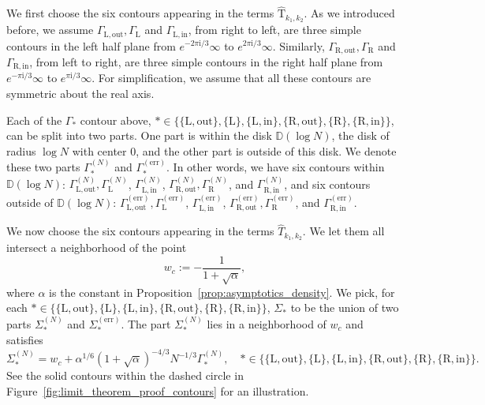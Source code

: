 \documentclass{article}
\numberwithin{equation}{section}
\newcommand{\exe}{\mathrm{err}}
\newcommand{\ii}{\mathrm{i}}
\newcommand{\inn}{\mathrm{in}}
\newcommand{\LL}{\mathrm{L}}
\newcommand{\out}{\mathrm{out}}
\newcommand{\RR}{\mathrm{R}}
\begin{document}
We first choose the six contours appearing in the terms $\mathrm{\hat T}_{k_1,k_2}$. As we introduced before, we assume $\Gamma_{\LL,\out},\Gamma_\LL$ and $\Gamma_{\LL,\inn}$, from right to left, are three  simple contours in the left half plane from $e^{-2\pi\ii/3}\infty$ to $e^{2\pi\ii/3}\infty$. Similarly, $\Gamma_{\RR,\out},\Gamma_\RR$ and $\Gamma_{\RR,\inn}$, from left to right, are three  simple contours in the right half plane from $e^{-\pi\ii/3}\infty$ to $e^{\pi\ii/3}\infty$. For simplification, we assume that all these contours are symmetric about the real axis.

Each of the $\Gamma_*$ contour above, $*\in\{\{\LL,\out\},\{\LL\},\{\LL,\inn\},\{\RR,\out\},\{\RR\},\{\RR,\inn\}\}$, can be split into two parts. One part is within the disk $\mathbb{D}(\log N)$, the disk of radius $\log N$ with center $0$, and the other part is outside of this disk. We denote these two parts $\Gamma^{(N)}_*$ and $\Gamma^{(\exe)}_*$. In other words, we have six contours within $\mathbb{D}(\log N)$:  $\Gamma_{\LL,\out}^{(N)},\Gamma_\LL^{(N)}$, $\Gamma_{\LL,\inn}^{(N)}$,  $\Gamma_{\RR,\out}^{(N)},\Gamma_\RR^{(N)}$, and $\Gamma_{\RR,\inn}^{(N)}$, and six contours outside of $\mathbb{D}(\log N)$:  $\Gamma_{\LL,\out}^{(\exe)},\Gamma_\LL^{(\exe)}$, $\Gamma_{\LL,\inn}^{(\exe)}$,  $\Gamma_{\RR,\out}^{(\exe)},\Gamma_\RR^{(\exe)}$, and $\Gamma_{\RR,\inn}^{(\exe)}$.

We now choose the six contours appearing in the terms $\hat T_{k_1,k_2}$. We let them all intersect a neighborhood  of the point
\begin{equation}
	\label{eq:def_w_c}
	w_c:=-\frac{1}{1+\sqrt{\alpha}},
	\end{equation}
where $\alpha$ is the constant in Proposition~\ref{prop:asymptotics_density}.
We pick, for each $*\in\{\{\LL,\out\},\{\LL\},\{\LL,\inn\},\{\RR,\out\},\{\RR\},\{\RR,\inn\}\}$, $\Sigma_*$ to be the union of two parts $\Sigma_*^{(N)}$ and $\Sigma_*^{(\exe)}$. The part $\Sigma_*^{(N)}$ lies in a neighborhood of $w_c$ and satisfies
\begin{equation}
	\label{eq:relation_contours}
	\Sigma_{*}^{(N)}= w_c + \alpha^{1/6}(1+\sqrt{\alpha})^{-4/3}N^{-1/3}\Gamma_*^{(N)},\quad *\in\{\{\LL,\out\},\{\LL\},\{\LL,\inn\},\{\RR,\out\},\{\RR\},\{\RR,\inn\}\}.
\end{equation}
See the solid contours within the dashed circle in Figure~\ref{fig:limit_theorem_proof_contours} for an illustration.
\end{document}
